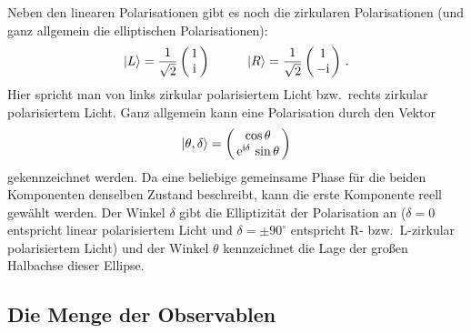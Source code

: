 Neben den linearen Polarisationen gibt es noch die zirkularen Polarisationen (und ganz allgemein die
elliptischen Polarisationen):
\begin{equation}
           |L\rangle = \frac{1}{\sqrt{2}} \left(\!\! \begin{array}{c}  1 \\ {\rm i} \end{array} \!\!\right)  \hspace{1cm}
           |R\rangle = \frac{1}{\sqrt{2}} \left(\!\! \begin{array}{c}  1  \\ - {\rm i} \end{array}\!\! \right)  \, . 
\end{equation} 
Hier spricht man von links zirkular polarisiertem Licht bzw.\ rechts zirkular polarisiertem Licht. 
Ganz allgemein kann eine Polarisation durch den Vektor
\begin{equation}
\label{eq_QM1_allgPol}
     |\theta, \delta \rangle =  \left( \!\!\begin{array}{c}  \cos \theta  \\ {\rm e}^{{\rm i}\delta} \, \sin \theta  \end{array} \!\!\right)    
\end{equation} 
gekennzeichnet werden. Da eine beliebige gemeinsame Phase f\"ur die beiden Komponenten
denselben Zustand beschreibt, kann die erste Komponente reell gew\"ahlt werden. Der Winkel
$\delta$ gibt die Elliptizit\"at der Polarisation an ($\delta=0$ entspricht linear polarisiertem Licht
und $\delta=\pm 90^\circ$ entspricht R- bzw.\ L-zirkular polarisiertem Licht) und der Winkel $\theta$ kennzeichnet die
Lage der gro\ss en Halbachse dieser Ellipse.  

\subsection{Die Menge der Observablen}

